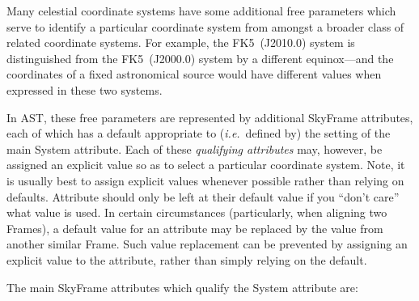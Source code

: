 \documentclass[twoside,11pt]{starlink}
\begin{document}
Many celestial coordinate systems have some additional free parameters
which serve to identify a particular coordinate system from amongst a
broader class of related coordinate systems. For example, the
FK5~(J2010.0) system is distinguished from the FK5~(J2000.0)
system by a different equinox---and the coordinates of a fixed
astronomical source would have different values when expressed in
these two systems.

In AST, these free parameters are represented by additional SkyFrame
attributes, each of which has a default appropriate to
(\emph{i.e.}\ defined by) the setting of the main System
attribute. Each of these \emph{qualifying attributes} may, however, be
assigned an explicit value so as to select a particular coordinate
system. Note, it is usually best to assign explicit
values whenever possible rather than relying on defaults. Attribute
should only be left at their default value if you ``don't care'' what
value is used. In certain circumstances (particularly, when aligning two
Frames), a default value for an attribute may be replaced by the value
from another similar Frame. Such value replacement can be prevented by
assigning an explicit value to the attribute, rather than simply relying on
the default.


The main SkyFrame attributes which qualify the System attribute are:
\end{document}
